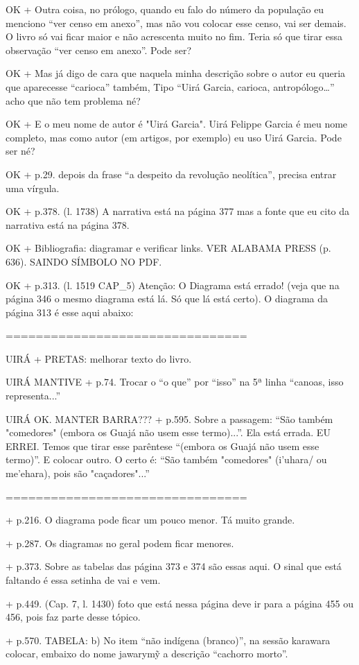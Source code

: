 OK + Outra coisa, no prólogo, quando eu falo do número da população eu menciono “ver censo em anexo”, mas não vou colocar esse censo, vai ser demais. O livro só vai ficar maior e não acrescenta muito no fim. 
Teria só que tirar essa observação “ver censo em anexo”. Pode ser?

OK + Mas já digo de cara que naquela minha descrição sobre o autor eu queria que aparecesse “carioca” também, Tipo “Uirá Garcia, carioca, antropólogo…” acho que não tem problema né?

OK + E o meu nome de autor é "Uirá Garcia". Uirá Felippe Garcia é meu nome completo, mas como autor (em artigos, por exemplo) eu uso Uirá Garcia. Pode ser né?

OK + p.29. depois da frase “a despeito da revolução neolítica”, precisa entrar uma vírgula.

OK + p.378. (l. 1738) A narrativa está na página 377 mas a fonte que eu cito da narrativa está na página 378.

OK + Bibliografia: diagramar e verificar links. VER ALABAMA PRESS (p. 636). SAINDO SÍMBOLO NO PDF.

OK + p.313. (l. 1519 CAP_5) Atenção: O Diagrama está errado! (veja que na página 346 o mesmo diagrama está lá. Só que lá está certo). O diagrama da página 313 é esse aqui abaixo:

================================

UIRÁ + PRETAS: melhorar texto do livro.

UIRÁ MANTIVE + p.74. Trocar o “o que” por “isso” na 5ª linha “canoas, isso representa...”

UIRÁ OK. MANTER BARRA??? + p.595. Sobre a passagem: “São também "comedores" (embora os Guajá não usem esse termo)...”. Ela está errada. EU ERREI. Temos que tirar esse parêntese “(embora os Guajá não usem esse termo)”. E colocar outro. O certo é: “São também "comedores" (i’uhara/ ou me’ehara), pois são "caçadores"...”

================================

+ p.216. O diagrama pode ficar um pouco menor. Tá muito grande.

+ p.287. Os diagramas no geral podem ficar menores.

+ p.373. Sobre as tabelas das página 373 e 374 são essas aqui. O sinal que está faltando é essa setinha de vai e vem.

+ p.449. (Cap. 7, l. 1430) foto que está nessa página deve ir para a página 455 ou 456, pois faz parte desse tópico.

+ p.570. TABELA: 
b) No item “não indígena (branco)”, na sessão karawara colocar, embaixo do nome jawarymỹ a descrição “cachorro morto”.

